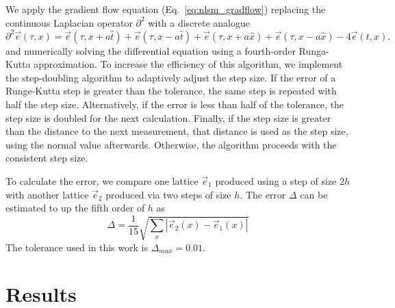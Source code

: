 \documentclass[a4paper,11pt]{article}
\newcommand{\e}{\vec e}
\begin{document}
We apply the gradient flow equation (Eq.~\ref{eq:nlsm_gradflow}) replacing the continuous Laplacian operator $\partial^2$ with a discrete analogue
\begin{equation*}
    \partial^2 \e(\tau,x) = \e(\tau, x+a \hat{t}) + \e(\tau,x-a\hat t) + \e(\tau, x+a \hat{x}) + \e(\tau,x-a\hat x) - 4 \e(t,x).
\end{equation*}
and numerically solving the differential equation using a fourth-order Runga-Kutta approximation. To increase the efficiency of this algorithm, we implement the step-doubling algorithm to adaptively adjust the step size. If the error of a Runge-Kutta step is greater than the tolerance, the same step is repeated with half the step size. Alternatively, if the error is less than half of the tolerance, the step size is doubled for the next calculation. Finally, if the step size is greater than the distance to the next measurement, that distance is used as the step size, using the normal value afterwards. Otherwise, the algorithm proceeds with the consistent step size.

To calculate the error, we compare one lattice $\e_1$ produced using a step of size $2h$ with another lattice $\e_2$ produced via two steps of size $h$. The error $\Delta$ can be estimated to up the fifth order of $h$ as \cite{vetterling1992}
\begin{equation}
\Delta = \frac{1}{15}\sqrt{\sum_x \left| \e_2(x) - \e_1(x) \right|}
\end{equation}
The tolerance used in this work is $\Delta_{max}=0.01$.












\section{Results}
\label{sec:results}
\end{document}
